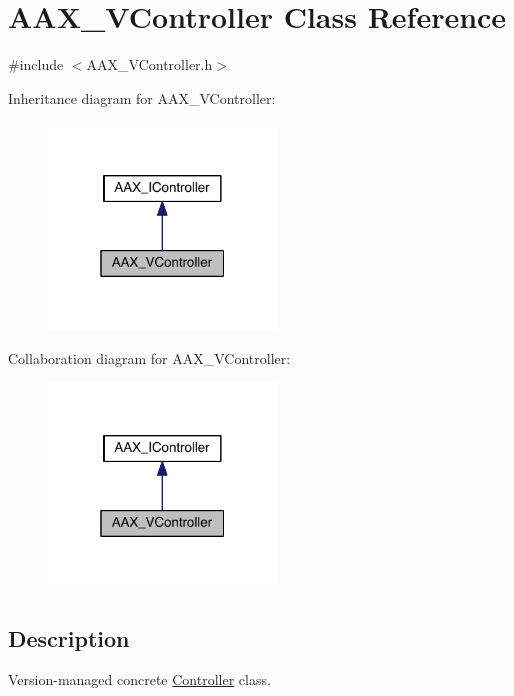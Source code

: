 \hypertarget{a00132}{}\section{A\+A\+X\+\_\+\+V\+Controller Class Reference}
\label{a00132}


{\ttfamily \#include $<$A\+A\+X\+\_\+\+V\+Controller.\+h$>$}



Inheritance diagram for A\+A\+X\+\_\+\+V\+Controller\+:
\nopagebreak
\begin{figure}[H]
\begin{center}
\leavevmode
\includegraphics[width=172pt]{a00692}
\end{center}
\end{figure}


Collaboration diagram for A\+A\+X\+\_\+\+V\+Controller\+:
\nopagebreak
\begin{figure}[H]
\begin{center}
\leavevmode
\includegraphics[width=172pt]{a00693}
\end{center}
\end{figure}


\subsection{Description}
Version-\/managed concrete \hyperlink{a00090}{Controller} class. 


